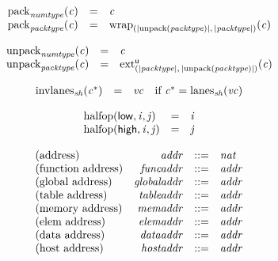 \vspace{1ex}

$$
\begin{array}{@{}lcl@{}l@{}}
{{\mathrm{pack}}}_{{\mathit{numtype}}}({\mathit{c}}) &=& {\mathit{c}} &  \\
{{\mathrm{pack}}}_{{\mathit{packtype}}}({\mathit{c}}) &=& {{{\mathrm{wrap}}}_{({|{\mathrm{unpack}}({\mathit{packtype}})|},\, {|{\mathit{packtype}}|})}}{({\mathit{c}})} &  \\
\end{array}
$$

$$
\begin{array}{@{}lcl@{}l@{}}
{{\mathrm{unpack}}}_{{\mathit{numtype}}}({\mathit{c}}) &=& {\mathit{c}} &  \\
{{\mathrm{unpack}}}_{{\mathit{packtype}}}({\mathit{c}}) &=& {{{{\mathrm{ext}}}_{({|{\mathit{packtype}}|},\, {|{\mathrm{unpack}}({\mathit{packtype}})|})}^{\mathsf{u}}}}{({\mathit{c}})} &  \\
\end{array}
$$

\vspace{1ex}

$$
\begin{array}{@{}lcl@{}l@{}}
{{\mathrm{invlanes}}}_{{\mathit{sh}}}({{\mathit{c}}^\ast}) &=& {\mathit{vc}} &\quad
  \mbox{if}~{{\mathit{c}}^\ast} = {{\mathrm{lanes}}}_{{\mathit{sh}}}({\mathit{vc}}) \\
\end{array}
$$

$$
\begin{array}{@{}lcl@{}l@{}}
{\mathrm{halfop}}(\mathsf{low}, {\mathit{i}}, {\mathit{j}}) &=& {\mathit{i}} &  \\
{\mathrm{halfop}}(\mathsf{high}, {\mathit{i}}, {\mathit{j}}) &=& {\mathit{j}} &  \\
\end{array}
$$

$$
\begin{array}{@{}lrrl@{}l@{}}
\mbox{(address)} & {\mathit{addr}} &::=& {\mathit{nat}} \\
\mbox{(function address)} & {\mathit{funcaddr}} &::=& {\mathit{addr}} \\
\mbox{(global address)} & {\mathit{globaladdr}} &::=& {\mathit{addr}} \\
\mbox{(table address)} & {\mathit{tableaddr}} &::=& {\mathit{addr}} \\
\mbox{(memory address)} & {\mathit{memaddr}} &::=& {\mathit{addr}} \\
\mbox{(elem address)} & {\mathit{elemaddr}} &::=& {\mathit{addr}} \\
\mbox{(data address)} & {\mathit{dataaddr}} &::=& {\mathit{addr}} \\
\mbox{(host address)} & {\mathit{hostaddr}} &::=& {\mathit{addr}} \\
\end{array}
$$

